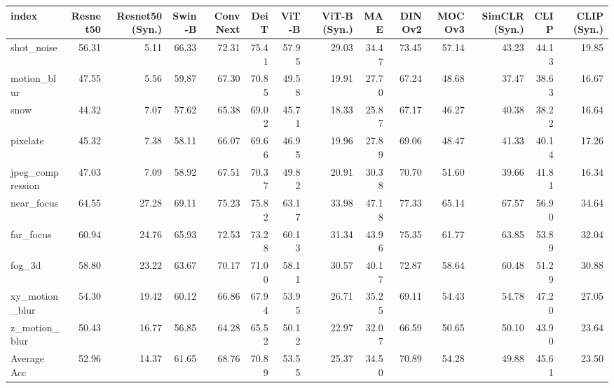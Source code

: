 \begin{tabular}{lrrrrrrrrrrrrr}
\toprule
index & Resnet50 & Resnet50 (Syn.) & Swin-B & ConvNext & DeiT & ViT-B & ViT-B (Syn.) & MAE & DINOv2 & MOCOv3 & SimCLR (Syn.) & CLIP & CLIP (Syn.) \\
\midrule
shot_noise & 56.31 & 5.11 & 66.33 & 72.31 & 75.41 & 57.95 & 29.03 & 34.47 & 73.45 & 57.14 & 43.23 & 44.13 & 19.85 \\
motion_blur & 47.55 & 5.56 & 59.87 & 67.30 & 70.85 & 49.58 & 19.91 & 27.70 & 67.24 & 48.68 & 37.47 & 38.63 & 16.67 \\
snow & 44.32 & 7.07 & 57.62 & 65.38 & 69.02 & 45.71 & 18.33 & 25.87 & 67.17 & 46.27 & 40.38 & 38.22 & 16.64 \\
pixelate & 45.32 & 7.38 & 58.11 & 66.07 & 69.66 & 46.95 & 19.96 & 27.89 & 69.06 & 48.47 & 41.33 & 40.14 & 17.26 \\
jpeg_compression & 47.03 & 7.09 & 58.92 & 67.51 & 70.37 & 49.82 & 20.91 & 30.38 & 70.70 & 51.60 & 39.66 & 41.81 & 16.34 \\
near_focus & 64.55 & 27.28 & 69.11 & 75.23 & 75.82 & 63.17 & 33.98 & 47.18 & 77.33 & 65.14 & 67.57 & 56.90 & 34.64 \\
far_focus & 60.94 & 24.76 & 65.93 & 72.53 & 73.28 & 60.13 & 31.34 & 43.96 & 75.35 & 61.77 & 63.85 & 53.89 & 32.04 \\
fog_3d & 58.80 & 23.22 & 63.67 & 70.17 & 71.00 & 58.11 & 30.57 & 40.17 & 72.87 & 58.64 & 60.48 & 51.29 & 30.88 \\
xy_motion_blur & 54.30 & 19.42 & 60.12 & 66.86 & 67.94 & 53.95 & 26.71 & 35.25 & 69.11 & 54.43 & 54.78 & 47.20 & 27.05 \\
z_motion_blur & 50.43 & 16.77 & 56.85 & 64.28 & 65.52 & 50.12 & 22.97 & 32.07 & 66.59 & 50.65 & 50.10 & 43.90 & 23.64 \\
Average Acc & 52.96 & 14.37 & 61.65 & 68.76 & 70.89 & 53.55 & 25.37 & 34.50 & 70.89 & 54.28 & 49.88 & 45.61 & 23.50 \\
\bottomrule
\end{tabular}
